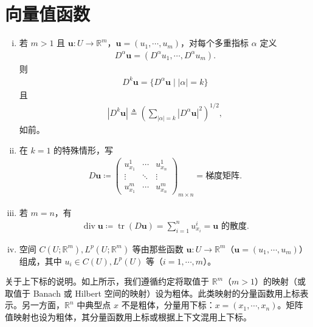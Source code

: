 \documentclass[../main.tex]{subfiles}
\begin{document}
\section{向量值函数}\label{section:appA-向量值函数}

\begin{enumerate}[(i)]
\item 若 $m>1$ 且 $\mathbf{u}:U\to\mathbb{R}^m$，$\mathbf{u}=(u_1,\cdots,u_m)$，对每个多重指标 $\alpha$ 定义
\begin{align*}
D^\alpha\mathbf{u}=(D^\alpha u_1,\cdots,D^\alpha u_m).
\end{align*}
则
\begin{align*}
D^k\mathbf{u}=\{D^\alpha\mathbf{u}\mid|\alpha|=k\}
\end{align*}
且
\begin{align*}
|D^k\mathbf{u}|\triangleq\left(\sum_{|\alpha|=k}|D^\alpha\mathbf{u}|^2\right)^{1/2},
\end{align*}
如前。

\item 在 $k=1$ 的特殊情形，写
\begin{align*}
D\mathbf{u}\coloneqq
\begin{pmatrix}
u^1_{x_1} & \cdots & u^1_{x_n}\\
\vdots & \ddots & \vdots\\
u^m_{x_1} & \cdots & u^m_{x_n}
\end{pmatrix}_{m\times n}
=\text{梯度矩阵}.
\end{align*}

\item 若 $m=n$，有
\begin{align*}
\operatorname{div}\mathbf{u}\coloneqq\operatorname{tr}(D\mathbf{u})=\sum_{i=1}^n u^i_{x_i}=\mathbf{u}\text{ 的散度}.
\end{align*}

\item 空间 $C(U;\mathbb{R}^m),L^p(U;\mathbb{R}^m)$ 等由那些函数 $\mathbf{u}:U\to\mathbb{R}^m$（$\mathbf{u}=(u_1,\cdots,u_m)$）组成，其中 $u_i\in C(U),L^p(U)$ 等（$i=1,\cdots,m$）。
\end{enumerate}

\begin{remark}\label{remark:appA-上下标说明}
关于上下标的说明。如上所示，我们遵循约定将取值于 $\mathbb{R}^m$（$m>1$）的映射（或取值于 Banach 或 Hilbert 空间的映射）设为粗体。此类映射的分量函数用上标表示。另一方面，$\mathbb{R}^n$ 中典型点 $x$ 不是粗体，分量用下标：$x=(x_1,\cdots,x_n)$。矩阵值映射也设为粗体，其分量函数用上标或根据上下文混用上下标。
\end{remark}
\end{document}
